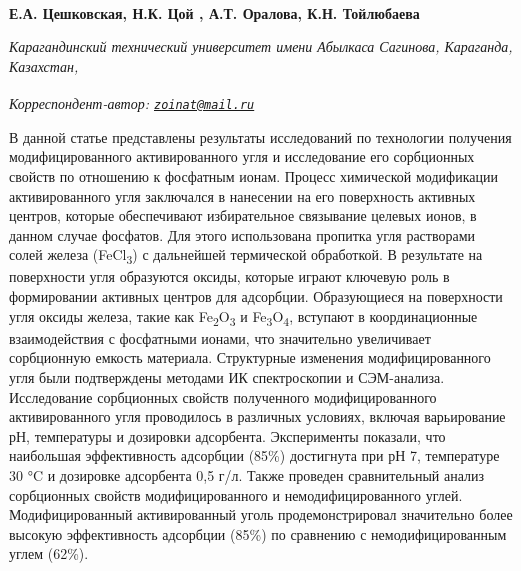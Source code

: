 
\begin{articleheader}

{\bfseries
Е.А. Цешковская,
Н.К. Цой\textsuperscript{\envelope } ,
А.Т. Оралова,
К.Н. Тойлюбаева}
\end{articleheader}

\begin{affiliation}
\emph{Карагандинский технический университет имени Абылкаса Сагинова, Караганда, Казахстан,}

\raggedright \textsuperscript{\envelope }{\em Корреспондент-автор: \href{mailto:zoinat@mail.ru}{\nolinkurl{zoinat@mail.ru}}}
\end{affiliation}

В данной статье представлены результаты исследований по технологии
получения модифицированного активированного угля и исследование его
сорбционных свойств по отношению к фосфатным ионам. Процесс химической
модификации активированного угля заключался в нанесении на его
поверхность активных центров, которые обеспечивают избирательное
связывание целевых ионов, в данном случае фосфатов. Для этого
использована пропитка угля растворами солей железа
(FeCl\textsubscript{3}) с дальнейшей термической обработкой. В
результате на поверхности угля образуются оксиды, которые играют
ключевую роль в формировании активных центров для адсорбции.
Образующиеся на поверхности угля оксиды железа, такие как
Fe\textsubscript{2}O\textsubscript{3} и
Fe\textsubscript{3}O\textsubscript{4}, вступают в координационные
взаимодействия с фосфатными ионами, что значительно увеличивает
сорбционную емкость материала. Структурные изменения модифицированного
угля были подтверждены методами ИК спектроскопии и СЭМ-анализа.
Исследование сорбционных свойств полученного модифицированного
активированного угля проводилось в различных условиях, включая
варьирование рН, температуры и дозировки адсорбента. Эксперименты
показали, что наибольшая эффективность адсорбции (85\%) достигнута при
рН 7, температуре 30 °C и дозировке адсорбента 0,5 г/л. Также проведен
сравнительный анализ сорбционных свойств модифицированного и
немодифицированного углей. Модифицированный активированный уголь
продемонстрировал значительно более высокую эффективность адсорбции
(85\%) по сравнению с немодифицированным углем (62\%).

